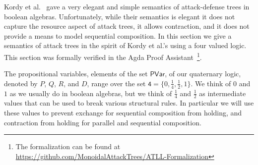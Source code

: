 \newcommand{\forth}{\frac{1}{4}}
\newcommand{\half}{\frac{1}{2}}

Kordy et al.~\cite{Kordy:2012} gave a very elegant and simple
semantics of attack-defense trees in boolean algebras.  Unfortunately,
while their semantics is elegant it does not capture the resource
aspect of attack trees, it allows contraction, and it does not provide
a means to model sequential composition.  In this section we give a
semantics of attack trees in the spirit of Kordy et al.'s using a four
valued logic.  This section was formally verified in the Agda Proof
Assistant~\cite{Norell:2009}\footnote{The formalization can be found
  at \url{https://github.com/MonoidalAttackTrees/ATLL-Formalization}}.

The propositional variables, elements of the set $\mathsf{PVar}$, of
our quaternary logic, denoted by $P$, $Q$, $R$, and $D$, range over
the set $\mathsf{4} = \{0, \forth, \half, 1\}$.  We think of $0$ and
$1$ as we usually do in boolean algebras, but we think of $\forth$ and
$\half$ as intermediate values that can be used to break various
structural rules.  In particular we will use these values to prevent
exchange for sequential composition from holding, and contraction from
holding for parallel and sequential composition.
